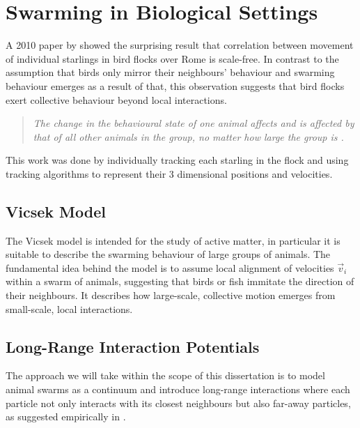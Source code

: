 \section{Swarming in Biological Settings}
A 2010 paper by \citeauthor{2010-starlings} showed the surprising result that correlation between movement of individual starlings in bird flocks over Rome is scale-free.
In contrast to the assumption that birds only mirror their neighbours' behaviour and swarming behaviour emerges as a result of that, this observation suggests that bird flocks exert collective behaviour beyond local interactions.
\begin{quote}\itshape
  The change in the behavioural state of one animal affects and is affected by that of all other animals in the group, no matter how large the group is \parencite{2010-starlings}.
\end{quote}
This work was done by individually tracking each starling in the flock and using tracking algorithms to represent their 3 dimensional positions and velocities.

\subsection{Vicsek Model}
The Vicsek model \parencite{1995-vicsek-model} is intended for the study of active matter, in particular it is suitable to describe the swarming behaviour of large groups of animals.
The fundamental idea behind the model is to assume local alignment of velocities $\vec{v}_i$ within a swarm of animals, suggesting that birds or fish immitate the direction of their neighbours.
It describes how large-scale, collective motion emerges from small-scale, local interactions.

\subsection{Long-Range Interaction Potentials}
The approach we will take within the scope of this dissertation is to model animal swarms as a continuum and introduce long-range interactions where each particle not only interacts with its closest neighbours but also far-away particles, as suggested empirically in \cite{2010-starlings}.

